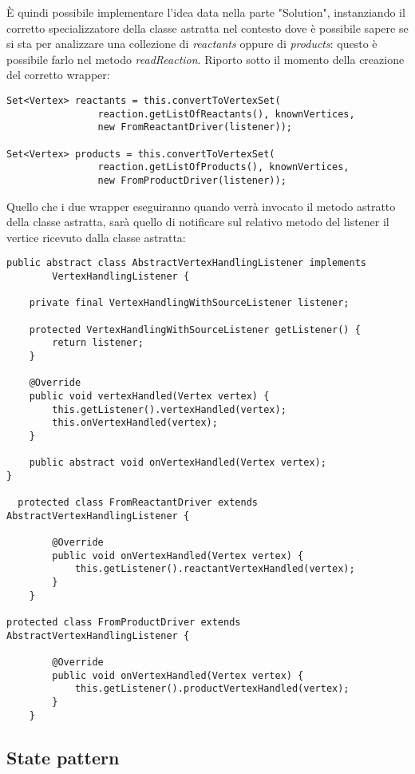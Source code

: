 \`E quindi possibile implementare l'idea data nella parte "Solution",
instanziando il corretto specializzatore della classe astratta nel
contesto dove \`e possibile sapere se si sta per analizzare una
collezione di \emph{reactants} oppure di \emph{products}: questo \`e
possibile farlo nel metodo \emph{readReaction}. Riporto sotto il
momento della creazione del corretto wrapper:
\begin{lstlisting}
Set<Vertex> reactants = this.convertToVertexSet(
				reaction.getListOfReactants(), knownVertices,
				new FromReactantDriver(listener));

Set<Vertex> products = this.convertToVertexSet(
				reaction.getListOfProducts(), knownVertices,
				new FromProductDriver(listener));
                              \end{lstlisting}
Quello che i due wrapper eseguiranno quando verr\`a invocato il metodo
astratto della classe astratta, sar\`a quello di notificare sul
relativo metodo del listener il vertice ricevuto dalla classe
astratta:
\begin{lstlisting}
public abstract class AbstractVertexHandlingListener implements
		VertexHandlingListener {

	private final VertexHandlingWithSourceListener listener;

	protected VertexHandlingWithSourceListener getListener() {
		return listener;
	}

	@Override
	public void vertexHandled(Vertex vertex) {
		this.getListener().vertexHandled(vertex);
		this.onVertexHandled(vertex);
	}

	public abstract void onVertexHandled(Vertex vertex);
}

  protected class FromReactantDriver extends AbstractVertexHandlingListener {

		@Override
		public void onVertexHandled(Vertex vertex) {
			this.getListener().reactantVertexHandled(vertex);
		}
	}

protected class FromProductDriver extends AbstractVertexHandlingListener {

		@Override
		public void onVertexHandled(Vertex vertex) {
			this.getListener().productVertexHandled(vertex);
		}
	}
\end{lstlisting}

\subsection{State pattern}

